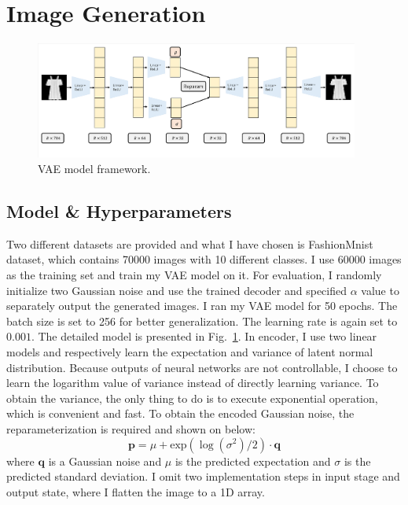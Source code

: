 
\section{Image Generation}
\begin{figure}
    \centering
    \includegraphics[width=0.95\textwidth]{vae_model.pdf}
    \caption{VAE model framework. }
    \label{fig:vae_model}
\end{figure}
\subsection{Model \& Hyperparameters}
Two different datasets are provided and what I have chosen is FashionMnist dataset, which contains 70000 images with 10 different classes. 
I use 60000 images as the training set and train my VAE model on it.
For evaluation, I randomly initialize two Gaussian noise and use the trained decoder and specified $\alpha$ value to separately output the generated images.
\newline
\newline
\noindent 
I ran my VAE model for 50 epochs.
The batch size is set to 256 for better generalization.
The learning rate is again set to $0.001$.
The detailed model is presented in Fig.~\ref{fig:vae_model}.
In encoder, I use two linear models and respectively learn the expectation and variance of latent normal distribution.
Because outputs of neural networks are not controllable, I choose to learn the logarithm value of variance instead of directly learning variance.
To obtain the variance, the only thing to do is to execute exponential operation, which is convenient and fast.
To obtain the encoded Gaussian noise, the reparameterization is required and shown on below:
\begin{equation}
    \boldsymbol{p} = \mu + \mathrm{exp}(\log(\sigma ^2) / 2)\cdot \boldsymbol{q}
\end{equation}
where $\boldsymbol{q}$ is a Gaussian noise and $\mu$ is the predicted expectation and $\sigma$ is the predicted standard deviation. 
I omit two implementation steps in input stage and output state, where I flatten the image to a 1D array.

